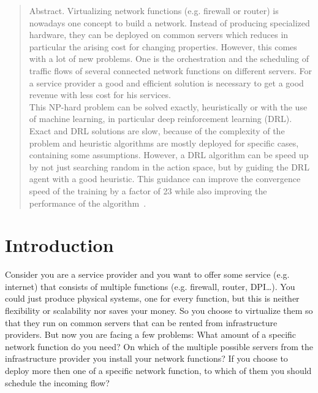 \begin{abstract}
Abstract. Virtualizing network functions (e.g. firewall or router) is nowadays one concept to build a network. Instead of producing specialized hardware, they can be deployed on common servers which reduces in particular the arising cost for changing properties. However, this comes with a lot of new problems. One is the orchestration and the scheduling of traffic flows of several connected network functions on different servers. 
For a service provider a good and efficient solution is necessary to get a good revenue with less cost for his services.\\
This NP-hard problem can be solved exactly, heuristically or with the use of machine learning, in particular deep reinforcement learning (DRL). Exact and DRL solutions are slow, because of the complexity of the problem and heuristic algorithms are mostly deployed for specific cases, containing some assumptions. However, a DRL algorithm can be speed up by not just searching random in the action space, but by guiding the DRL agent with a good heuristic. This guidance can improve the convergence speed of the training by a factor of 23 while also improving the performance of the algorithm~\cite {Gu}.
\end{abstract}

\section{Introduction}%
\label{sec:introduction}
Consider you are a service provider and you want to offer some service (e.g. internet) that consists of multiple functions (e.g. firewall, router, DPI\dots). You could just produce physical systems, one for every function, but this is neither flexibility or scalability nor saves your money. So you choose to virtualize them so that they run on common servers that can be rented from infrastructure providers. But now you are facing a few problems: What amount of a specific network function do you need? On which of the multiple possible servers from the infrastructure provider you install your network functions? If you choose to deploy more then one of a specific network function, to which of them you should schedule the incoming flow?\\

